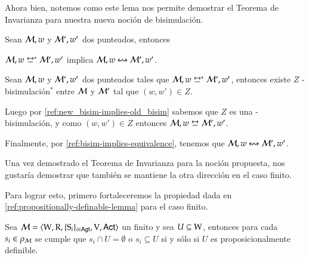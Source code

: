 Ahora bien, notemos como este lema nos permite demostrar el Teorema de Invarianza para nuestra nueva noción de bisimulación.

\begin{teorema}
    Sean $\mathcal{M},w$ y $\mathcal{M}',w'$ dos \ultss punteados, entonces
    \begin{center}
        $\modults,w \bisim^* \modults',w'$ implica $\mathcal{M},w \mathrel{\leftrightsquigarrow} \mathcal{M}',w'$.
    \end{center}
\end{teorema}

\begin{demostracion}
    Sean $\mathcal{M},w$ y $\mathcal{M}',w'$ dos \ultss punteados tales que $\modults,w \bisim^* \modults',w'$, entonces existe $Z$ \KHilogic-bisimulación$^*$
    entre $\mathcal{M}$ y $\mathcal{M}'$ tal que $(w,w') \in Z$.
    
    Luego por \ref{ref:new_bisim-implies-old_bisim} sabemos que $Z$ es una \KHilogic-bisimulación, y como $(w,w') \in Z$ entonces $\modults,w \bisim \modults',w'$.

    Finalmente, por \ref{ref:bisim-implies-equivalence}, tenemos que $\mathcal{M},w \mathrel{\leftrightsquigarrow} \mathcal{M}',w'$.
\end{demostracion}

Una vez demostrado el Teorema de Invarianza para la noción propuesta, nos gustaría demostrar que también se mantiene la otra dirección en
el caso finito. 

Para lograr esto, primero fortaleceremos la propiedad dada en \ref{ref:propositionally-definable-lemma} para el caso finito.

\begin{lema}\label{ref:finite-propositionally-definable-lemma}
    Sea $\mathcal{M}=\langle \mathrm{W},\mathrm{R},\{ \mathrm{S}_i \}_{i \in {\rm \sf Agt}},\mathrm{V},{\rm \sf Act} \rangle$ un \ults finito y sea $U \subseteq \mathrm{W}$, entonces
    para cada $s_i \in \rho_{\mathcal{M}}$ se cumple que $s_i \cap U = \emptyset$ o $s_i \subseteq U$ si y sólo si $U$ es proposicionalmente definible.
\end{lema}

